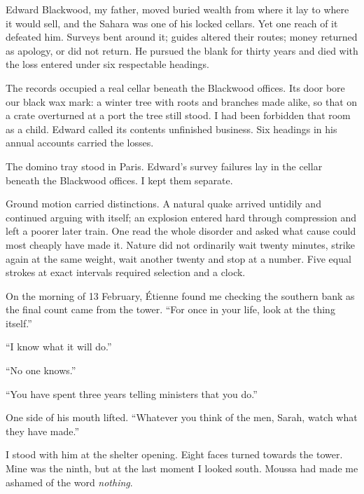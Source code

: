 Edward Blackwood, my father, moved buried wealth from where it lay to where it would sell, and the Sahara was one of his locked cellars. Yet one reach of it defeated him. Surveys bent around it; guides altered their routes; money returned as apology, or did not return. He pursued the blank for thirty years and died with the loss entered under six respectable headings.\par

The records occupied a real cellar beneath the Blackwood offices. Its door bore our black wax mark: a winter tree with roots and branches made alike, so that on a crate overturned at a port the tree still stood. I had been forbidden that room as a child. Edward called its contents unfinished business. Six headings in his annual accounts carried the losses.\par

The domino tray stood in Paris. Edward's survey failures lay in the cellar beneath the Blackwood offices. I kept them separate.\par

Ground motion carried distinctions. A natural quake arrived untidily and continued arguing with itself; an explosion entered hard through compression and left a poorer later train. One read the whole disorder and asked what cause could most cheaply have made it. Nature did not ordinarily wait twenty minutes, strike again at the same weight, wait another twenty and stop at a number. Five equal strokes at exact intervals required selection and a clock.\par

On the morning of 13 February, Étienne found me checking the southern bank as the final count came from the tower. “For once in your life, look at the thing itself.”\par

“I know what it will do.”\par

“No one knows.”\par

“You have spent three years telling ministers that you do.”\par

One side of his mouth lifted. “Whatever you think of the men, Sarah, watch what they have made.”\par

I stood with him at the shelter opening. Eight faces turned towards the tower. Mine was the ninth, but at the last moment I looked south. Moussa had made me ashamed of the word \emph{nothing}.\par

